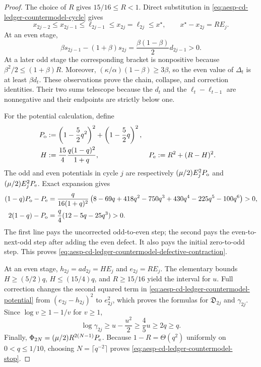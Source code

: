 \begin{proof}
The choice of $R$ gives $15/16\leq R<1$.  Direct substitution in
\cref{eq:aesp-cd-ledger-countermodel-cycle} gives
\begin{equation*}
 x_{2j-2}\leq x_{2j-1}\leq\ell_{2j-1}
 \leq x_{2j}=\ell_{2j}\leq x^\star,
 \qquad
 x^\star-x_{2j}=RE_j.
\end{equation*}
At an even stage,
\begin{equation*}
 \beta s_{2j-1}-(1+\beta)s_{2j}
 =\frac{\beta(1-\beta)}2d_{2j-1}>0.
\end{equation*}
At a later odd stage the corresponding bracket is nonpositive because
$\beta^2/2\leq(1+\beta)R$.  Moreover,
$(\kappa/\alpha)(1-\beta)\geq3\beta$, so the even value of
$\Delta_t$ is at least $\beta d_t$.  These observations prove the chain,
collapse, and correction identities.  Their two sums telescope because the
$d_t$ and the $\ell_t-\ell_{t-1}$ are nonnegative and their endpoints are
strictly below one.

For the potential calculation, define
\begin{align}
 P_{\rm o}&:=\left(1-\frac52q^2\right)^2
             +\left(1-\frac52q\right)^2,\notag\\
 H&:=\frac{15}{4}\frac{q(1-q)^2}{1+q},
 &P_{\rm e}&:=R^2+(R-H)^2.
 \label{eq:aesp-cd-ledger-countermodel-polynomials}
\end{align}
The odd and even potentials in cycle $j$ are respectively
$(\mu/2)E_j^2P_{\rm o}$ and $(\mu/2)E_j^2P_{\rm e}$.  Exact expansion gives
\begin{align}
 (1-q)P_{\rm o}-P_{\rm e}
 &=\frac{q}{16(1+q)^2}
 \left(8-69q+418q^2-750q^3+430q^4-225q^5-100q^6\right)>0,
 \notag\\
 2(1-q)-P_{\rm o}
 &=\frac q4(12-5q-25q^3)>0.
 \label{eq:aesp-cd-ledger-countermodel-differences}
\end{align}
The first line pays the uncorrected odd-to-even step; the second pays the
even-to-next-odd step after adding the even defect.  It also pays the initial
zero-to-odd step.  This proves
\cref{eq:aesp-cd-ledger-countermodel-defective-contraction}.

At an even stage, $h_{2j}=ad_{2j}=HE_j$ and $e_{2j}=RE_j$.
The elementary bounds $H\geq(5/2)q$, $H\leq(15/4)q$, and
$R\geq15/16$ yield the interval for $u$.  Full correction changes the second
squared term in \cref{eq:aesp-cd-ledger-countermodel-potential} from
$(e_{2j}-h_{2j})^2$ to $e_{2j}^2$, which proves the formulas for
$\mathfrak D_{2j}$ and $\gamma_{2j}$.  Since
$\log v\geq1-1/v$ for $v\geq1$,
\begin{equation*}
 \log\gamma_{2j}\geq u-\frac{u^2}{2}
 \geq\frac45u\geq2q\geq q.
\end{equation*}
Finally,
$\Phi_{2N}=(\mu/2)R^{2(N-1)}P_{\rm e}$.  Because
$1-R=\Theta(q^2)$ uniformly on $0<q\leq1/10$, choosing
$N=\lceil q^{-2}\rceil$ proves
\cref{eq:aesp-cd-ledger-countermodel-stop}.
\end{proof}

